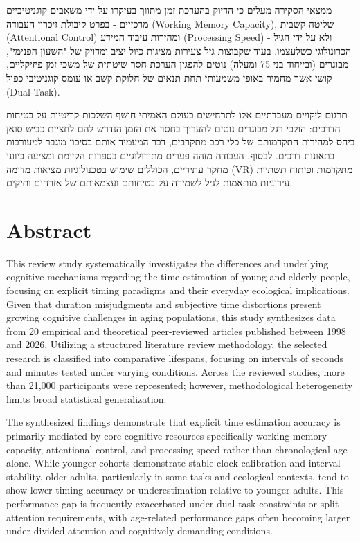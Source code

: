 \documentclass{custom_report}
\begin{document}
ממצאי הסקירה מעלים כי הדיוק בהערכת זמן מתווך בעיקרו על ידי משאבים קוגניטיביים מרכזיים - בפרט קיבולת זיכרון העבודה (Working Memory Capacity), שליטה קשבית (Attentional Control) ומהירות עיבוד המידע (Processing Speed) - ולא על ידי הגיל הכרונולוגי כשלעצמו. בעוד שקבוצות גיל צעירות מציגות כיול יציב ומדויק של "השעון הפנימי", מבוגרים (ובייחוד בני 75 ומעלה) נוטים להפגין הערכת חסר שיטתית של משכי זמן פיזיקליים, קושי אשר מחמיר באופן משמעותי תחת תנאים של חלוקת קשב או עומס קוגניטיבי כפול (Dual-Task).

תרגום ליקויים מעבדתיים אלו לתרחישים בעולם האמיתי חושף השלכות קריטיות על בטיחות הדרכים: הולכי רגל מבוגרים נוטים להעריך בחסר את הזמן הנדרש להם לחציית כביש סואן ביחס למהירות התקדמותם של כלי רכב מתקרבים, דבר המעמיד אותם בסיכון מוגבר למעורבות בתאונות דרכים. לבסוף, העבודה מזהה פערים מתודולוגיים בספרות הקיימת ומציעה כיווני מחקר עתידיים, הכוללים שימוש בטכנולוגיות מציאות מדומה (VR) מתקדמות ופיתוח תשתיות עירוניות מותאמות לגיל לשמירה על בטיחותם ועצמאותם של אזרחים ותיקים.

\newpage

\chapter*{Abstract}
This review study systematically investigates the differences and underlying cognitive mechanisms regarding the time estimation of young and elderly people, focusing on explicit timing paradigms and their everyday ecological implications. Given that duration misjudgments and subjective time distortions present growing cognitive challenges in aging populations, this study synthesizes data from 20 empirical and theoretical peer-reviewed articles published between 1998 and 2026. Utilizing a structured literature review methodology, the selected research is classified into comparative lifespans, focusing on intervals of seconds and minutes tested under varying conditions. Across the reviewed studies, more than 21,000 participants were represented; however, methodological heterogeneity limits broad statistical generalization.

The synthesized findings demonstrate that explicit time estimation accuracy is primarily mediated by core cognitive resources-specifically working memory capacity, attentional control, and processing speed rather than chronological age alone. While younger cohorts demonstrate stable clock calibration and interval stability, older adults, particularly in some tasks and ecological contexts, tend to show lower timing accuracy or underestimation relative to younger adults. This performance gap is frequently exacerbated under dual-task constraints or split-attention requirements, with age-related performance gaps often becoming larger under divided-attention and cognitively demanding conditions.
\end{document}
